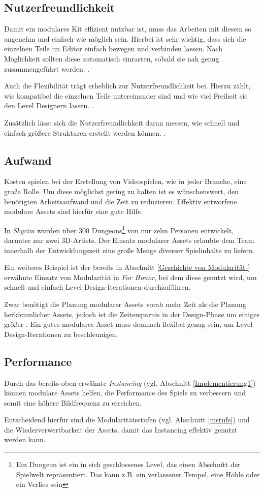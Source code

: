 \subsection{Nutzerfreundlichkeit}
Damit ein modulares Kit effizient nutzbar ist, muss das Arbeiten mit diesem so angenehm und einfach wie möglich sein. Hierbei ist sehr wichtig, dass sich die einzelnen Teile im Editor einfach bewegen  und verbinden lassen. Nach Möglichkeit sollten diese automatisch einrasten, sobald sie nah genug zusammengeführt werden. \parencite{Mader}.
\par
Auch die Flexibilität trägt erheblich zur Nutzerfreundlichkeit bei. Hierzu zählt, wie kompatibel die einzelnen Teile untereinander sind und wie viel Freiheit sie den Level Designern lassen. \parencite{unrealModular}.
\par
Zusätzlich lässt sich die Nutzerfreundlichkeit daran messen, wie schnell und einfach größere Strukturen erstellt werden können. \parencite{Mader}.
\subsection{Aufwand}
Kosten spielen bei der Erstellung von Videospielen, wie in jeder Branche, eine große Rolle. Um diese möglichst gering zu halten ist es wünschenswert, den benötigten Arbeitsaufwand und die Zeit zu reduzieren. Effektiv entworfene modulare Assets sind hierfür eine gute Hilfe.
\par
In \textit{Skyrim} wurden über 300 Dungeons\footnote{Ein Dungeon ist ein in sich geschlossenes Level, das einen Abschnitt der Spielwelt repräsentiert. Das kann z.B. ein verlassener Tempel, eine Höhle oder ein Verlies sein} von nur zehn Personen entwickelt, darunter nur zwei 3D-Artists. Der Einsatz modularer Assets erlaubte dem Team innerhalb der Entwicklungszeit eine große Menge diverser Spielinhalte zu liefern. \parencite{Burgess}
\par
Ein weiteres Beispiel ist der bereits in Abschnitt \ref{Geschichte von Modularität } erwähnte Einsatz von Modularität in  \textit{For Honor}, bei dem diese genutzt wird, um schnell und einfach Level-Design-Iterationen durchzuführen. \parencite{ForHonor}
\par
Zwar benötigt die Planung modularer Assets vorab mehr Zeit als die Planung herkömmlicher Assets, jedoch ist die Zeitersparnis in der Design-Phase um einiges größer \parencite{Meler}. Ein gutes modulares Asset muss demnach flexibel genug sein, um Level-Design-Iterationen zu beschleunigen.
\subsection{Performance}
Durch das bereits oben erwähnte \textit{Instancing} (vgl. Abschnitt \ref{Implementierung1}) können modulare Assets helfen, die Performance des Spiels zu verbessern und somit eine höhere Bildfrequenz zu erreichen.
\par
Entscheidend hierfür sind die Modularitätsstufen (vgl. Abschnitt \ref{mstufe}) und die Wiederverwertbarkeit der Assets, damit das Instancing effektiv genutzt werden kann.
\newpage

